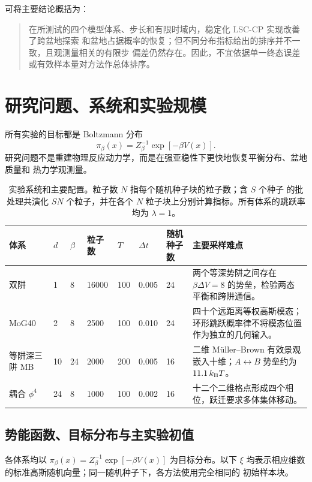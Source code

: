 \documentclass[11pt,a4paper]{article}
\begin{document}
\noindent
可将主要结论概括为：
\begin{quote}
在所测试的四个模型体系、步长和有限时域内，稳定化 LSC-CP 实现改善了跨盆地探索
和盆地占据概率的恢复；但不同分布指标给出的排序并不一致，且观测量相关的有限步
偏差仍然存在。因此，不宜依据单一终态误差或有效样本量对方法作总体排序。
\end{quote}

\section{研究问题、系统和实验规模}

所有实验的目标都是 Boltzmann 分布
\begin{equation}
 \pi_\beta(x)=Z_\beta^{-1}\exp[-\beta V(x)].
\end{equation}
研究问题不是重建物理反应动力学，而是在强亚稳性下更快地恢复平衡分布、盆地质量和
热力学观测量。

\begin{table}[H]
\centering
\small
\begin{tabularx}{\textwidth}{L{2.2cm}C{0.8cm}C{0.9cm}C{1.3cm}C{1.0cm}C{1.2cm}C{1.0cm}Y}
\toprule
体系 & $d$ & $\beta$ & 粒子数 & $T$ & $\Delta t$ & 随机种子数 & 主要采样难点 \\
\midrule
双阱 & 1 & 8 & 16000 & 100 & 0.005 & 24 &
两个等深势阱之间存在 $\beta\Delta V=8$ 的势垒，检验两态平衡和跨阱通信。 \\
MoG40 & 2 & 8 & 2500 & 100 & 0.010 & 24 &
四十个远距离等权高斯模态；环形跳跃概率律不将模态位置作为独立的几何输入。 \\
等阱深三阱 MB & 10 & 24 & 2000 & 200 & 0.005 & 16 &
二维 Müller--Brown 有效景观嵌入十维；$A\leftrightarrow B$ 势垒约为 $11.1\,k_{\rm B}T$。 \\
耦合 $\phi^4$ & 24 & 8 & 1000 & 100 & 0.002 & 16 &
十二个二维格点形成四个相位，跃迁要求多体集体移动。 \\
\bottomrule
\end{tabularx}
\caption{实验系统和主要配置。粒子数 $N$ 指每个随机种子块的粒子数；含 $S$ 个种子
的批处理共演化 $SN$ 个粒子，并在各个 $N$ 粒子块上分别计算指标。所有体系的跳跃率
均为 $\lambda=1$。}
\end{table}

\subsection{势能函数、目标分布与主实验初值}

各体系均以
\(\pi_\beta(x)=Z_\beta^{-1}\exp[-\beta V(x)]\) 为目标分布。以下
$\xi$ 均表示相应维数的标准高斯随机向量；同一随机种子下，各方法使用完全相同的
初始样本块。
\end{document}
